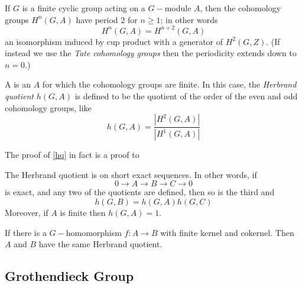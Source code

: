 If $G$ is a finite cyclic group acting on a $G-$module $A$, then the cohomology groups $H^n(G,A)$ have period $2$ for $n\geqslant1$; in other words
\begin{equation*}
H^n(G,A) = H^{n+2}(G,A)
\end{equation*}
an isomorphism induced by cup product with a generator of $H^2(G,Z)$. (If instead we use the \emph{\red  Tate cohomology groups} then the periodicity extends down to $n=0$.)

A  is an $A$ for which the cohomology groups are finite. In this case, the \emph{\red  Herbrand quotient} $h(G,A)$ is defined to be the quotient of the order of the even and odd cohomology groups, like
\begin{equation*}
h(G,A)=\frac{|H^2(G,A)|}{|H^1(G,A)|}
\end{equation*}

The proof of \ref{hq} in fact is a proof to
\begin{prop}
The Herbrand quotient is  on short exact sequences. In other words, if
\begin{equation*}
0\longrightarrow A\longrightarrow B\longrightarrow C\longrightarrow 0
\end{equation*}
is exact, and any two of the quotients are defined, then so is the third and
\begin{equation*}
h(G,B)=h(G,A)h(G,C)
\end{equation*}
Moreover, if $A$ is finite then $h(G,A)=1$.
\end{prop}
\begin{cor}
  If there is a $G-$homomorphism $f\colon A\to B$ with finite kernel and cokernel. Then $A$ and $B$ have the same Herbrand quotient.
\end{cor}

\subsection{Grothendieck Group}

